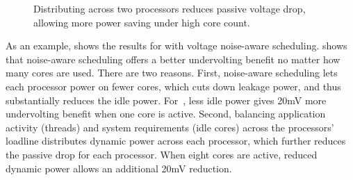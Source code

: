 \begin{figure}[t]
\centering
\vspace*{-10pt}
\hfill
{}
\caption{Distributing  across two processors reduces passive voltage drop, allowing more power saving under high core count.}
\vspace{-0.4cm}
\label{fig:split_raytrace}
\end{figure}

As an example,  shows the results for  with voltage noise-aware scheduling.  shows that noise-aware scheduling offers a better undervolting benefit no matter how many cores are used. There are two reasons. First, noise-aware scheduling lets each processor power on fewer cores, which cuts down leakage power, and thus substantially reduces the idle power. For~, less idle power gives 20mV more undervolting benefit when one core is active. Second, balancing application activity (threads) and system requirements (idle cores) across the processors' loadline distributes dynamic power across each processor, which further reduces the passive drop for each processor. When eight cores are active, reduced dynamic power allows an additional 20mV reduction. 

